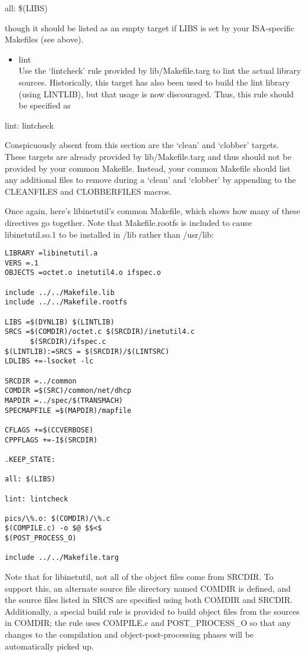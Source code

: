 \documentclass{article}
\begin{document}
all: \$(LIBS)

though it should be listed as an empty target if LIBS is set by your
ISA-specific Makefiles (see above).

\begin{itemize}
\item lint \hfill \\
  Use the `lintcheck' rule provided by lib/Makefile.targ to lint the actual
  library sources. Historically, this target has also been used to build the
  lint library (using LINTLIB), but that usage is now discouraged. Thus,
  this rule should be specified as
\end{itemize}

lint: lintcheck

Conspicuously absent from this section are the `clean' and `clobber'
targets. These targets are already provided by lib/Makefile.targ and thus
should not be provided by your common Makefile. Instead, your common Makefile
should list any additional files to remove during a `clean' and `clobber' by
appending to the CLEANFILES and CLOBBERFILES macros.

Once again, here's libinetutil's common Makefile, which shows how many of these
directives go together. Note that Makefile.rootfs is included to cause
libinetutil.so.1 to be installed in /lib rather than /usr/lib:

\begin{verbatim}
LIBRARY =libinetutil.a
VERS =.1
OBJECTS =octet.o inetutil4.o ifspec.o

include ../../Makefile.lib
include ../../Makefile.rootfs

LIBS =$(DYNLIB) $(LINTLIB)
SRCS =$(COMDIR)/octet.c $(SRCDIR)/inetutil4.c
      $(SRCDIR)/ifspec.c
$(LINTLIB):=SRCS = $(SRCDIR)/$(LINTSRC)
LDLIBS +=-lsocket -lc

SRCDIR =../common
COMDIR =$(SRC)/common/net/dhcp
MAPDIR =../spec/$(TRANSMACH)
SPECMAPFILE =$(MAPDIR)/mapfile

CFLAGS +=$(CCVERBOSE)
CPPFLAGS +=-I$(SRCDIR)

.KEEP_STATE:

all: $(LIBS)

lint: lintcheck

pics/\%.o: $(COMDIR)/\%.c
$(COMPILE.c) -o $@ $$<$
$(POST_PROCESS_O)

include ../../Makefile.targ
\end{verbatim}

Note that for libinetutil, not all of the object files come from SRCDIR. To
support this, an alternate source file directory named COMDIR is defined, and
the source files listed in SRCS are specified using both COMDIR and
SRCDIR. Additionally, a special build rule is provided to build object files
from the sources in COMDIR; the rule uses COMPILE.c and POST\_PROCESS\_O so that
any changes to the compilation and object-post-processing phases will be
automatically picked up.
\end{document}
